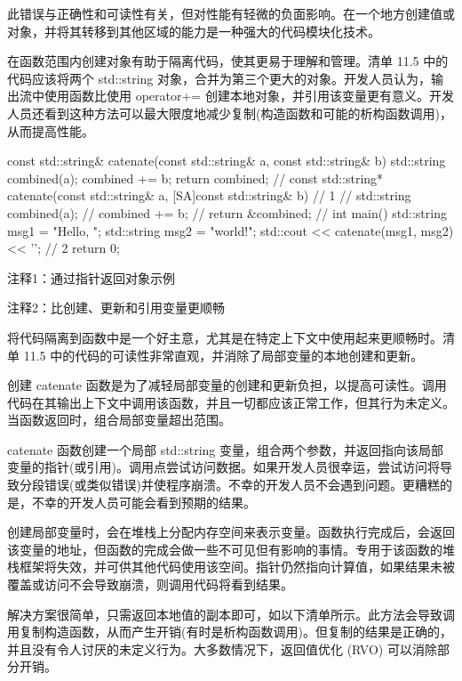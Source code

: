 此错误与正确性和可读性有关，但对性能有轻微的负面影响。在一个地方创建值或对象，并将其转移到其他区域的能力是一种强大的代码模块化技术。


在函数范围内创建对象有助于隔离代码，使其更易于理解和管理。清单 11.5 中的代码应该将两个 std::string 对象，合并为第三个更大的对象。开发人员认为，输出流中使用函数比使用 operator+= 创建本地对象，并引用该变量更有意义。开发人员还看到这种方法可以最大限度地减少复制(构造函数和可能的析构函数调用)，从而提高性能。


\begin{cpp}
const std::string& catenate(const std::string& a, const std::string& b) {
  std::string combined(a);
  combined += b;
  return combined;
}
// const std::string* catenate(const std::string& a,
  [SA]const std::string& b) { // 1
// std::string combined(a);
// combined += b;
// return &combined;
// }
int main() {
  std::string msg1 = "Hello, ";
  std::string msg2 = "world!";
  std::cout << catenate(msg1, msg2) << '\n'; // 2
  return 0;
}
\end{cpp}

{\footnotesize
注释1：通过指针返回对象示例

注释2：比创建、更新和引用变量更顺畅
}


将代码隔离到函数中是一个好主意，尤其是在特定上下文中使用起来更顺畅时。清单 11.5 中的代码的可读性非常直观，并消除了局部变量的本地创建和更新。

创建 catenate 函数是为了减轻局部变量的创建和更新负担，以提高可读性。调用代码在其输出上下文中调用该函数，并且一切都应该正常工作，但其行为未定义。当函数返回时，组合局部变量超出范围。

catenate 函数创建一个局部 std::string 变量，组合两个参数，并返回指向该局部变量的指针(或引用)。调用点尝试访问数据。如果开发人员很幸运，尝试访问将导致分段错误(或类似错误)并使程序崩溃。不幸的开发人员不会遇到问题。更糟糕的是，不幸的开发人员可能会看到预期的结果。

创建局部变量时，会在堆栈上分配内存空间来表示变量。函数执行完成后，会返回该变量的地址，但函数的完成会做一些不可见但有影响的事情。专用于该函数的堆栈框架将失效，并可供其他代码使用该空间。指针仍然指向计算值，如果结果未被覆盖或访问不会导致崩溃，则调用代码将看到结果。


解决方案很简单，只需返回本地值的副本即可，如以下清单所示。此方法会导致调用复制构造函数，从而产生开销(有时是析构函数调用)。但复制的结果是正确的，并且没有令人讨厌的未定义行为。大多数情况下，返回值优化 (RVO) 可以消除部分开销。

